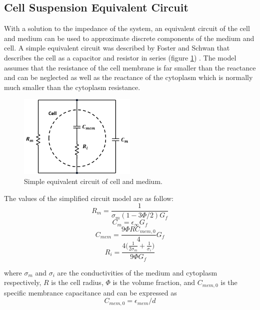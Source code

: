  \subsection{Cell Suspension Equivalent Circuit}
 
 \par With a solution to the impedance of the system, an equivalent circuit of the cell and medium can be used to approximate discrete components of the medium and cell. A simple equivalent circuit was described by Foster and Schwan that describes the cell as a capacitor and resistor in series (figure \ref{fig:simple_equiv_circuit_cell_medium}) \cite{schwan_electrical_1994}. The model assumes that the resistance of the cell membrane is far smaller than the reactance and can be neglected as well as the reactance of the cytoplasm which is normally much smaller than the cytoplasm resistance.
 
 \begin{figure}
     \centering
     \includegraphics[width=0.5\textwidth]{images/simpleCellMediumCircuit.png}
     \caption{Simple equivalent circuit of cell and medium.}
     \label{fig:simple_equiv_circuit_cell_medium}
 \end{figure}
 
 \noindent The values of the simplified circuit model are as follow:
 \begin{equation}
     R_m = \frac{1}{\sigma_m(1-3\Phi/2)G_f}
 \end{equation}
 \begin{equation}
     C_m = \epsilon_\infty G_f
 \end{equation}
 \begin{equation}
     C_{mem} = \frac{9\Phi RC_{mem,0}}{4}G_f
 \end{equation}
 \begin{equation}
     R_i = \frac{4\Big(\frac{1}{2\sigma_m}+\frac{1}{\sigma_i}\Big)}{9\Phi G_f}
 \end{equation}
 
 \noindent where $\sigma_m$ and $\sigma_i$ are the conductivities of the medium and cytoplasm respectively, $R$ is the cell radius, $\Phi$ is the volume fraction, and $C_{mem,0}$ is the specific membrance capacitance and can be expressed as \cite{sun_single-cell_2010}
 \begin{equation}
   C_{mem,0} = \epsilon_{mem}/d  
 \end{equation}
 

